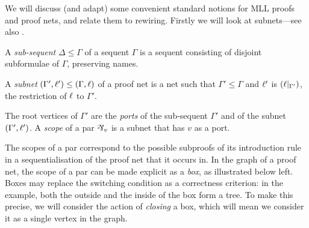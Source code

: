 \documentclass{sigplanconf-modified}
\let\aftersubsection=\noindent
\let\capsabbrev=\uppercase
\begin{document}
\aftersubsection
We will discuss (and adapt) some convenient standard notions for \capsabbrev{mll} proofs and proof nets, and relate them to rewiring.
%
Firstly we will look at subnets---see also \cite{Bellin-vandeWiele-1995}.


\begin{definition}
A \emph{sub-sequent} $\Delta\leq\Gamma$ of a sequent $\Gamma$ is a sequent consisting of disjoint subformulae of $\Gamma$, preserving names.
\end{definition}

\begin{definition}
A \emph{subnet} $(\Gamma',\ell') \leq (\Gamma,\ell)$ of a proof net is a net such that $\Gamma'\leq\Gamma$ and $\ell'$ is $(\ell|_{\Gamma'})$, the restriction of $\ell$ to $\Gamma'$.
\end{definition}


The root vertices of $\Gamma'$ are the \emph{ports} of the sub-sequent $\Gamma'$ and of the subnet $(\Gamma',\ell')$.
%
A \emph{scope} of a par $\named v\parr$ is a subnet that has $v$ as a port.


The scopes of a par correspond to the possible subproofs of its introduction rule in a sequentialisation of the proof net that it occurs in.
%
\color{red}
In the graph of a proof net, the scope of a par can be made explicit as a \emph{box}, as illustrated below left.
%
Boxes may replace the switching condition as a correctness criterion: in the example, both the outside and the inside of the box form a tree.
%
To make this precise, we will consider the action of \emph{closing} a box, which will mean we consider it as a single vertex in the graph.
\end{document}
